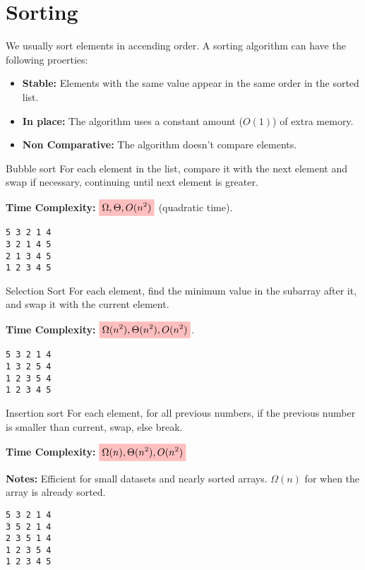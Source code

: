 \section{Sorting}

We usually sort elements in accending order.
A sorting algorithm can have the following proerties:
\begin{itemize}
    \item \textbf{Stable:} Elements with the same value appear in the same order in the sorted list.
    \item \textbf{In place:} The algorithm uses a constant amount ($O(1)$) of extra memory.
    \item \textbf{Non Comparative:} The algorithm doesn't compare elements.
\end{itemize}

\begin{knBox}
    {Bubble sort}
    For each element in the list, compare it with the next element and swap if necessary, continuing until next element is greater.

    \textbf{Time Complexity:} $\mathcolorbox{pink}{\Omega,\Theta,O(n^2)}$ (quadratic time).
    \tcblower
    \begin{lstlisting}
5 3 2 1 4
3 2 1 4 5
2 1 3 4 5
1 2 3 4 5\end{lstlisting}
\end{knBox}

\begin{knBox}
    {Selection Sort}
    For each element, find the minimum value in the subarray after it, and swap it with the current element.

    \textbf{Time Complexity:} $\mathcolorbox{pink}{\Omega(n^2),\Theta(n^2),O(n^2)}$.
    \tcblower
    \begin{lstlisting}
5 3 2 1 4
1 3 2 5 4
1 2 3 5 4
1 2 3 4 5\end{lstlisting}
\end{knBox}

\begin{definition}
    {Insertion sort}
    For each element, for all previous numbers, if the previous number is smaller than current, swap, else break.

    \textbf{Time Complexity:} $\mathcolorbox{pink}{\Omega(n),\Theta(n^2),O(n^2)}$

    \textbf{Notes:} Efficient for small datasets and nearly sorted arrays. $\Omega(n)$ for when the array is already sorted.
    \tcblower
    \begin{lstlisting}
5 3 2 1 4
3 5 2 1 4
2 3 5 1 4
1 2 3 5 4
1 2 3 4 5\end{lstlisting}
\end{definition}

